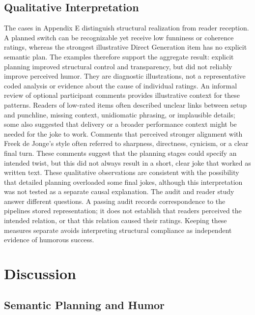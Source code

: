 \documentclass[11pt]{article}
\begin{document}
\subsection{Qualitative Interpretation}\label{qualitative-interpretation}

The cases in Appendix E distinguish structural realization from reader reception. A planned switch can be recognizable yet receive low funniness or coherence ratings, whereas the strongest illustrative Direct Generation item has no explicit semantic plan. The examples therefore support the aggregate result: explicit planning improved structural control and transparency, but did not reliably improve perceived humor. They are diagnostic illustrations, not a representative coded analysis or evidence about the cause of individual ratings. An informal review of optional participant comments provides illustrative context for these patterns. Readers of low-rated items often described unclear links between setup and punchline, missing context, unidiomatic phrasing, or implausible details; some also suggested that delivery or a broader performance context might be needed for the joke to work. Comments that perceived stronger alignment with Freek de Jonge's style often referred to sharpness, directness, cynicism, or a clear final turn. These comments suggest that the planning stages could specify an intended twist, but this did not always result in a short, clear joke that worked as written text. These qualitative observations are consistent with the possibility that detailed planning overloaded some final jokes, although this interpretation was not tested as a separate causal explanation. The audit and reader study answer different questions. A passing audit records correspondence to the pipeline\textquotesingle s stored representation; it does not establish that readers perceived the intended relation, or that this relation caused their ratings. Keeping these measures separate avoids interpreting structural compliance as independent evidence of humorous success.

\section{Discussion}\label{discussion}

\subsection{Semantic Planning and Humor}\label{semantic-planning-and-humor}
\end{document}
